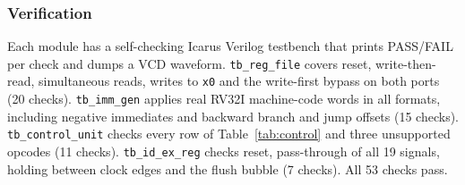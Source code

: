 \subsubsection{Verification}
Each module has a self-checking Icarus Verilog testbench that prints PASS/FAIL
per check and dumps a VCD waveform. \texttt{tb\_reg\_file} covers reset,
write-then-read, simultaneous reads, writes to \texttt{x0} and the write-first
bypass on both ports (20 checks). \texttt{tb\_imm\_gen} applies real RV32I
machine-code words in all formats, including negative immediates and backward
branch and jump offsets (15 checks). \texttt{tb\_control\_unit} checks every
row of Table~\ref{tab:control} and three unsupported opcodes (11 checks).
\texttt{tb\_id\_ex\_reg} checks reset, pass-through of all 19 signals, holding
between clock edges and the flush bubble (7 checks). All 53 checks pass.
